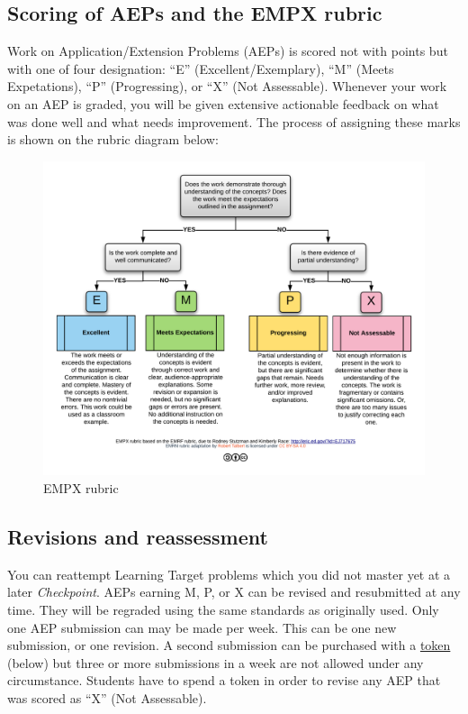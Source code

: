 \hypertarget{scoring-of-aeps-and-the-empx-rubric}{%
\subsection{Scoring of AEPs and the EMPX
rubric}\label{scoring-of-aeps-and-the-empx-rubric}}

Work on Application/Extension Problems (AEPs) is scored not with points
but with one of four designation: ``E'' (Excellent/Exemplary), ``M''
(Meets Expetations), ``P'' (Progressing), or ``X'' (Not Assessable).
Whenever your work on an AEP is graded, you will be given extensive
actionable feedback on what was done well and what needs improvement.
The process of assigning these marks is shown on the rubric diagram
below:

\begin{figure}
\centering
\includegraphics{./empx-rubric-v2021.png}
\caption{EMPX rubric}
\end{figure}

\hypertarget{revisions}{%
\subsection{Revisions and reassessment}\label{revisions}}

You can reattempt Learning Target problems which you did not master yet
at a later \emph{Checkpoint}. AEPs earning M, P, or X can be revised and
resubmitted at any time. They will be regraded using the same standards
as originally used. Only one AEP submission can may be made per week.
This can be one new submission, or one revision. A second submission can
be purchased with a \protect\hyperlink{tokens}{token} (below) but three
or more submissions in a week are not allowed under any circumstance.
Students have to spend a token in order to revise any AEP that was
scored as ``X'' (Not Assessable).

